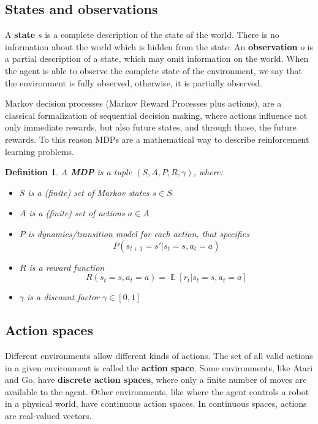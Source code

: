 \documentclass{article}
\newtheorem{definition}{Definition}
\DeclareMathOperator*{\E}{\mathbb{E}}
\begin{document}
\subsection{States and observations}
A \textbf{state} $s$ is a complete description of the state of the world. There is no information about the world which is hidden from the state. An \textbf{observation} $o$ is a partial description of a state, which may omit information on the world. When the agent is able to observe the complete state of the environment, we say that the environment is fully observed, otherwise, it is partially observed.

Markov decision processes (Markov Reward Processes plus actions), are a classical formalization of sequential decision making, where actions influence not only immediate rewards, but also future states, and through those, the future rewards. To this reason MDPs are a mathematical way to describe reinforcement learning problems. 

\begin{definition}
	A \textbf{MDP} is a tuple $(S,A, P, R, \gamma)$, where:
	\begin{itemize}
		\item $S$ is a (finite) set of Markov states $s \in S$
		\item $A$ is a (finite) set of actions $a \in A$
		\item $P$ is dynamics/transition model for each action, that specifies
		\begin{equation}
			P(s_{t+1} =s'|s_t =s,a_t =a)	
		\end{equation}
		\item $R$ is a reward function
		\begin{equation}
			R(s_t =s,a_t =a)=\E[r_t|s_t =s,a_t =a]	
		\end{equation}
		\item $\gamma$ is a discount factor $\gamma \in [0,1]$
	\end{itemize}
\end{definition}


\subsection{Action spaces}
Different environments allow different kinds of actions. The set of all valid actions in a given environment is called the \textbf{action space}. Some environments, like Atari and Go, have \textbf{discrete action spaces}, where only a finite number of moves are available to the agent. Other environments, like where the agent controls a robot in a physical world, have continuous action spaces. In continuous spaces, actions are real-valued vectors.
\end{document}
